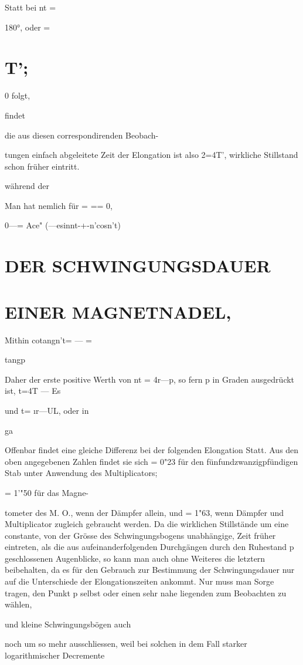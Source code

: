\documentclass[12pt,a4paper]{article}
\begin{document}
Statt bei nt =

180°, oder =

\section*{T’;}
0 folgt,

findet

die aus diesen correspondirenden Beobach-

tungen einfach abgeleitete Zeit der Elongation ist also 2=4T’, wirkliche Stillstand schon früher eintritt.

während der

Man hat nemlich für = == 0,

0—= Ace" (—esinnt-+-n'cosn’t)

\section*{DER SCHWINGUNGSDAUER}
\section*{EINER MAGNETNADEL,}
Mithin cotangn’t= — =

tangp

Daher der erste positive Werth von nt = 4r—p, so fern p in Graden ausgedrückt ist, t=4T — Es

und t= ır—UL, oder in

ga

Offenbar findet eine gleiche Differenz bei der folgenden Elongation Statt. Aus den oben angegebenen Zahlen findet sie sich = 0"23 für den fünfundzwanzigpfündigen Stab unter Anwendung des Multiplicators;

= 1’"50 für das Magne-

tometer des M. O., wenn der Dämpfer allein, und = 1"63, wenn Dämpfer und Multiplicator zugleich gebraucht werden. Da die wirklichen Stillstände um eine constante, von der Grösse des Schwingungsbogens unabhängige, Zeit früher eintreten, als die aus aufeinanderfolgenden Durchgängen durch den Ruhestand p geschlossenen Augenblicke, so kann man auch ohne Weiteres die letztern beibehalten, da es für den Gebrauch zur Bestimmung der Schwingungsdauer nur auf die Unterschiede der Elongationszeiten ankommt. Nur muss man Sorge tragen, den Punkt p selbst oder einen sehr nahe liegenden zum Beobachten zu wählen,

und kleine Schwingungsbögen auch

noch um so mehr ausschliessen, weil bei solchen in dem Fall starker logarithmischer Decremente
\end{document}
